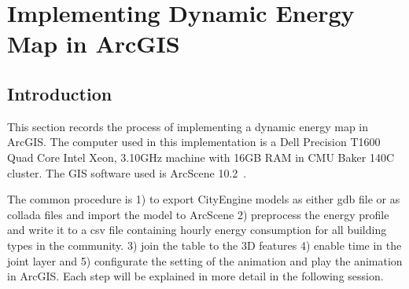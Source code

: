 
\chapter{Implementing Dynamic Energy Map in
  ArcGIS} %

\label{AppendixC} %

\section{Introduction}
This section records the process of implementing a dynamic energy map
in ArcGIS. The computer used in this implementation is a Dell
Precision T1600 Quad Core Intel Xeon, 3.10GHz machine with 16GB RAM in
CMU Baker 140C cluster. The GIS software used is ArcScene
10.2~\cite{arcScene2015}.

The common procedure is 1) to export CityEngine models as either gdb
file or as collada files and import the model to ArcScene 2)
preprocess the energy profile and write it to a csv file containing
hourly energy consumption for all building types in the
community. 3) join the table to the 3D features 4) enable time in the
joint layer and 5) configurate the setting of the animation and play
the animation in ArcGIS. Each step will be explained in more detail in
the following session.
